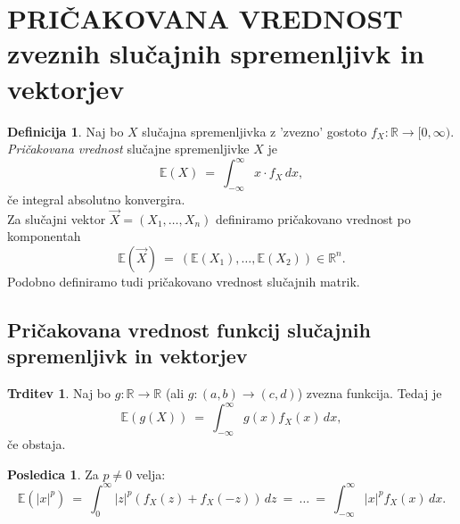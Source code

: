 \documentclass[11pt]{article}
\newcommand{\E}{\mathbb{E}}
\newcommand{\R}{\mathbb{R}}
\newcommand{\1}{\mathbbm{1}}
\theoremstyle{definition}
\newtheorem{definicija}{Definicija}[section]
\theoremstyle{definition}
\newtheorem{trditev}{Trditev}[section]
\theoremstyle{definition}
\newtheorem*{posledica}{Posledica}
\begin{document}
\pagebreak


\section{PRIČAKOVANA VREDNOST \\zveznih slučajnih spremenljivk in vektorjev}
\vspace{0.5cm}

\begin{definicija}

Naj bo $X$ slučajna spremenljivka z 'zvezno' gostoto $f_X: \R \rightarrow [0, \infty)$. \textit{Pričakovana vrednost} slučajne spremenljivke $X$ je
$$\E(X) ~=~ \int_{-\infty}^{\infty} x \cdot f_X\,dx,$$
če integral absolutno konvergira. \\

Za slučajni vektor $\vec{X} = (X_1, \ldots, X_n)$ definiramo pričakovano vrednost po komponentah
$$\E(\vec{X}) ~=~ (\E(X_1), \ldots, \E(X_2)) \in \R^n.$$
Podobno definiramo tudi pričakovano vrednost slučajnih matrik.

\end{definicija}
\vspace{0.5cm}


\subsection{Pričakovana vrednost funkcij slučajnih spremenljivk in vektorjev}
\vspace{0.5cm}

\begin{trditev}

Naj bo $g: \R \rightarrow \R$ (ali $g:(a, b) \rightarrow (c, d)$) zvezna funkcija. Tedaj je
$$\E(g(X)) ~=~ \int_{-\infty}^{\infty} g(x) f_X(x)\,dx,$$
če obstaja.

\end{trditev}
\vspace{0.5cm}

\begin{posledica}

Za $p \neq 0$ velja:
$$\E(|x|^p) ~=~ \int_0^{\infty} |z|^p (f_X(z) + f_X(-z))\,dz ~=~ \ldots ~=~ \int_{-\infty}^{\infty} |x|^p f_X(x)\,dx.$$

\end{posledica}
\vspace{0.5cm}
\end{document}
